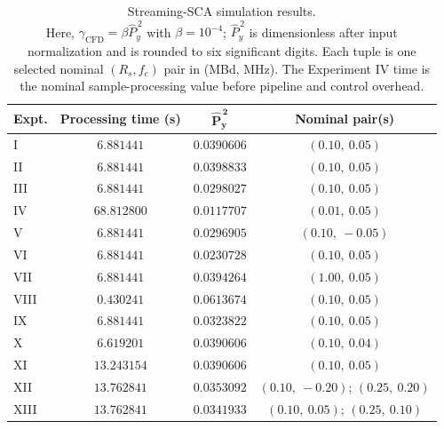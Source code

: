 \begin{table}[H]
\begin{center}
\caption[Performance results.]{Streaming-SCA simulation results. \\
Here, $\gamma_{\mathrm{CFD}}=\beta\widehat{P}_{y}^{\,2}$ with $\beta=10^{-4}$; $\widehat{P}_{y}^{\,2}$ is dimensionless after input normalization and is rounded to six significant digits.  Each tuple is one selected nominal $(R_s,f_c)$ pair in (MBd, MHz).  The Experiment IV time is the nominal sample-processing value before pipeline and control overhead.}
\label{tab:perf}
\setlength{\tabcolsep}{5pt}
\begin{tabular}{|l|c|c|c|}
\hline
\textbf{Expt.} & \textbf{Processing time (s)} & $\bm{\widehat{P}_{y}^{\,2}}$ & \textbf{Nominal pair(s)} \\
\hline
I    & $6.881441$  & $0.0390606$ & $(0.10,\ 0.05)$ \\
\hline
II   & $6.881441$  & $0.0398833$ & $(0.10,\ 0.05)$ \\
\hline
III  & $6.881441$  & $0.0298027$ & $(0.10,\ 0.05)$ \\
\hline
IV   & $68.812800$ & $0.0117707$ & $(0.01,\ 0.05)$ \\
\hline
V    & $6.881441$  & $0.0296905$ & $(0.10,\ {-}0.05)$ \\
\hline
VI   & $6.881441$  & $0.0230728$ & $(0.10,\ 0.05)$ \\
\hline
VII  & $6.881441$  & $0.0394264$ & $(1.00,\ 0.05)$ \\
\hline
VIII & $0.430241$  & $0.0613674$ & $(0.10,\ 0.05)$ \\
\hline
IX   & $6.881441$  & $0.0323822$ & $(0.10,\ 0.05)$ \\
\hline
X    & $6.619201$  & $0.0390606$ & $(0.10,\ 0.04)$ \\
\hline
XI   & $13.243154$ & $0.0390606$ & $(0.10,\ 0.05)$ \\
\hline
XII  & $13.762841$ & $0.0353092$ & $(0.10,\ {-}0.20)$; $(0.25,\ 0.20)$ \\
\hline
XIII & $13.762841$ & $0.0341933$ & $(0.10,\ 0.05)$; $(0.25,\ 0.10)$ \\
\hline
\end{tabular}
\end{center}
\end{table}

